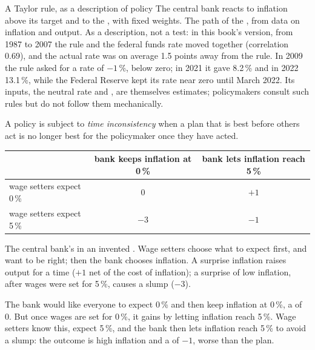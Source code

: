 \begin{model}{A Taylor rule, as a description of policy}
\assumes The central bank reacts to inflation above its target and to the , with fixed weights.
\predicts The path of the , from data on inflation and output.
\tested As a description, not a test: in this book's version, from 1987 to 2007 the rule and the federal funds rate moved together (correlation 0.69), and the actual rate was on average 1.5 points away
  from the rule.
\breaks In 2009 the rule asked for a rate of $-1\,\%$, below zero; in 2021 it gave 8.2\,\% and in 2022 13.1\,\%, while the Federal Reserve kept its rate near zero until March
  2022. Its inputs, the neutral rate and , are themselves estimates; policymakers consult such rules but do not follow them mechanically.
\end{model}

\begin{definition}\label{def:g12:monetary-policy:time-inconsistency}
A policy is subject to \emph{time inconsistency} when a plan that is best before others act is no longer best for the policymaker once they have
acted.
\end{definition}

\begin{omfigure}
\centering
\small
\begin{tabular}{lcc}
\toprule
 & bank keeps inflation at 0\,\% & bank lets inflation reach 5\,\% \\
\midrule
wage setters expect 0\,\% & 0 & $+1$ \\
wage setters expect 5\,\% & $-3$ & $-1$ \\
\bottomrule
\end{tabular}

\medskip
{\small The central bank's  in an invented . Wage setters choose what to expect first, and want to be right; then the bank chooses inflation. A surprise
inflation raises output for a time ($+1$ net of the cost of inflation); a surprise of low inflation, after wages were set for 5\,\%, causes a slump ($-3$).}
\end{omfigure}

The bank would like everyone to expect 0\,\% and then keep inflation at 0\,\%, a  of 0. But once wages are set for 0\,\%, it gains by letting inflation reach 5\,\%.
Wage setters know this, expect 5\,\%, and the bank then lets inflation reach 5\,\% to avoid a slump: the outcome is high inflation and a  of $-1$, worse than the
plan.

